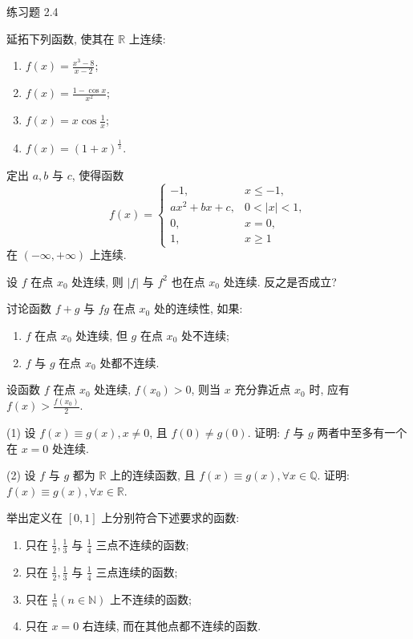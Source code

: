 \begin{exblock}{练习题 2.4}
\item 延拓下列函数, 使其在 $\mathbb{R}$ 上连续:
  \begin{enumerate}[label=(\arabic*)]
    \item $f(x) = \frac{x^3 - 8}{x - 2}$;
    \item $f(x) = \frac{1 - \cos x}{x^2}$;
    \item $f(x) = x\cos\frac{1}{x}$;
    \item $f(x) = (1 + x)^{\frac{1}{x}}$.
  \end{enumerate}

\item 定出 $a, b$ 与 $c$, 使得函数
  \[
  f(x) = \begin{cases} -1, & x \leqslant -1, \\ ax^2 + bx + c, & 0 < |x| < 1, \\ 0, & x = 0, \\ 1, & x \geqslant 1 \end{cases}
\]
  在 $(-\infty, +\infty)$ 上连续.

\item 设 $f$ 在点 $x_0$ 处连续, 则 $|f|$ 与 $f^2$ 也在点 $x_0$ 处连续. 反之是否成立?

\item 讨论函数 $f + g$ 与 $fg$ 在点 $x_0$ 处的连续性, 如果:
  \begin{enumerate}[label=(\arabic*)]
    \item $f$ 在点 $x_0$ 处连续, 但 $g$ 在点 $x_0$ 处不连续;
    \item $f$ 与 $g$ 在点 $x_0$ 处都不连续.
  \end{enumerate}

\item 设函数 $f$ 在点 $x_0$ 处连续, $f(x_0) > 0$, 则当 $x$ 充分靠近点 $x_0$ 时, 应有 $f(x) > \frac{f(x_0)}{2}$.

\item (1) 设 $f(x) \equiv g(x), x \neq 0$, 且 $f(0) \neq g(0)$. 证明: $f$ 与 $g$ 两者中至多有一个在 $x = 0$ 处连续.

  (2) 设 $f$ 与 $g$ 都为 $\mathbb{R}$ 上的连续函数, 且 $f(x) \equiv g(x), \forall x \in \mathbb{Q}$. 证明: $f(x) \equiv g(x), \forall x \in \mathbb{R}$.

\item 举出定义在 $[0, 1]$ 上分别符合下述要求的函数:
  \begin{enumerate}[label=(\arabic*)]
    \item 只在 $\frac{1}{2}, \frac{1}{3}$ 与 $\frac{1}{4}$ 三点不连续的函数;
    \item 只在 $\frac{1}{2}, \frac{1}{3}$ 与 $\frac{1}{4}$ 三点连续的函数;
    \item 只在 $\frac{1}{n}(n \in \mathbb{N})$ 上不连续的函数;
    \item 只在 $x = 0$ 右连续, 而在其他点都不连续的函数.
  \end{enumerate}


\end{exblock}
